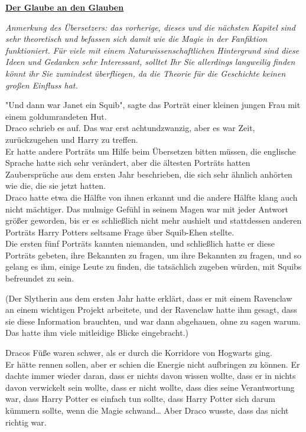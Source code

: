 

\hypertarget{der-glaube-an-den-glauben}{%

\textbf{\uline{Der Glaube an den Glauben}}

\emph{Anmerkung des Übersetzers: das vorherige, dieses und die nächsten Kapitel sind sehr theoretisch und befassen sich damit wie die Magie in der Fanfiktion funktioniert. Für viele mit einem Naturwissenschaftlichen Hintergrund sind diese Ideen und Gedanken sehr Interessant, solltet Ihr Sie allerdings langweilig finden könnt ihr Sie zumindest überfliegen, da die Theorie für die Geschichte keinen großen Einfluss hat.}

"Und dann war Janet ein Squib", sagte das Porträt einer kleinen jungen Frau mit einem goldumrandeten Hut.\\ Draco schrieb es auf. Das war erst achtundzwanzig, aber es war Zeit, zurückzugehen und Harry zu treffen.\\ Er hatte andere Porträts um Hilfe beim Übersetzen bitten müssen, die englische Sprache hatte sich sehr verändert, aber die ältesten Porträts hatten Zaubersprüche aus dem ersten Jahr beschrieben, die sich sehr ähnlich anhörten wie die, die sie jetzt hatten.\\ Draco hatte etwa die Hälfte von ihnen erkannt und die andere Hälfte klang auch nicht mächtiger. Das mulmige Gefühl in seinem Magen war mit jeder Antwort größer geworden, bis er es schließlich nicht mehr aushielt und stattdessen anderen Porträts Harry Potters seltsame Frage über Squib-Ehen stellte.\\ Die ersten fünf Porträts kannten niemanden, und schließlich hatte er diese Porträts gebeten, ihre Bekannten zu fragen, um ihre Bekannten zu fragen, und so gelang es ihm, einige Leute zu finden, die tatsächlich zugeben würden, mit Squibs befreundet zu sein.

(Der Slytherin aus dem ersten Jahr hatte erklärt, dass er mit einem Ravenclaw an einem wichtigen Projekt arbeitete, und der Ravenclaw hatte ihm gesagt, dass sie diese Information brauchten, und war dann abgehauen, ohne zu sagen warum.\\ Das hatte ihm viele mitleidige Blicke eingebracht.)

Dracos Füße waren schwer, als er durch die Korridore von Hogwarts ging.\\ Er hätte rennen sollen, aber er schien die Energie nicht aufbringen zu können. Er dachte immer wieder daran, dass er nichts davon wissen wollte, dass er in nichts davon verwickelt sein wollte, dass er nicht wollte, dass dies seine Verantwortung war, dass Harry Potter es einfach tun sollte, dass Harry Potter sich darum kümmern sollte, wenn die Magie schwand… Aber Draco wusste, dass das nicht richtig war.

}
